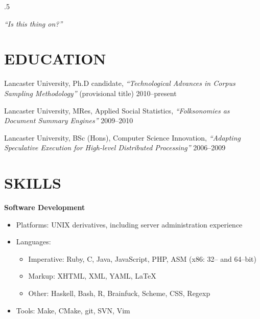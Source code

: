 \documentclass{res}
\begin{document}
 
\thispagestyle{empty} %
\address{\texttt{http://stephenwattam.com/}}


\begin{resume}
\vspace{0.2in}
\moveleft.5\sectionwidth\centerline{\it ``Is this thing on?''}  

\section{EDUCATION}
\vspace{0.1in} 
 
    Lancaster University, Ph.D candidate,
    \textit{``Technological Advances in Corpus Sampling Methodology''} (provisional title)
    2010--present

    Lancaster University, MRes,
    Applied Social Statistics, 
    \textit{``Folksonomies as Document Summary Engines''}
    2009--2010

    Lancaster University, BSc (Hons),
    Computer Science Innovation, 
    \textit{``Adapting Speculative Execution for High-level Distributed Processing''}
    2006--2009

 
\section{SKILLS} 
\vspace{0.1in}

   {\bf Software Development} 
        \begin{itemize}
            \item[] Platforms: UNIX derivatives, including server administration experience
            \item[] Languages:
                \begin{itemize}
                    \item Imperative: Ruby, C, Java, JavaScript, PHP, ASM (x86: 32-- and 64--bit)
                    \item Markup: XHTML, XML, YAML, \LaTeX
                    \item Other: Haskell, Bash, R, Brainfuck, Scheme, CSS, Regexp
                \end{itemize}
            \item[] Tools: Make, CMake, git, SVN, Vim 
        \end{itemize}


\end{resume}
\end{document}
